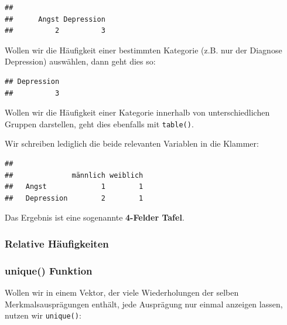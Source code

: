 \documentclass[
]{book}
\newenvironment{Shaded}{\begin{snugshade}}{\end{snugshade}}
\newcommand{\FunctionTok}[1]{\textcolor[rgb]{0.13,0.29,0.53}{\textbf{#1}}}
\newcommand{\NormalTok}[1]{#1}
\newcommand{\SpecialCharTok}[1]{\textcolor[rgb]{0.81,0.36,0.00}{\textbf{#1}}}
\newcommand{\StringTok}[1]{\textcolor[rgb]{0.31,0.60,0.02}{#1}}
\begin{document}
\begin{verbatim}
## 
##      Angst Depression 
##          2          3
\end{verbatim}

Wollen wir die Häufigkeit einer bestimmten Kategorie (z.B. nur der Diagnose Depression) auswählen, dann geht dies so:

\begin{Shaded}
\end{Shaded}

\begin{verbatim}
## Depression 
##          3
\end{verbatim}

Wollen wir die Häufigkeit einer Kategorie innerhalb von unterschiedlichen Gruppen darstellen, geht dies ebenfalls mit \texttt{table()}.

Wir schreiben lediglich die beide relevanten Variablen in die Klammer:

\begin{Shaded}
\end{Shaded}

\begin{verbatim}
##             
##              männlich weiblich
##   Angst             1        1
##   Depression        2        1
\end{verbatim}

Das Ergebnis ist eine sogenannte \textbf{4-Felder Tafel}.

\subsubsection{Relative Häufigkeiten}\label{relative-huxe4ufigkeiten}

\subsubsection{unique() Funktion}\label{unique-funktion}

Wollen wir in einem Vektor, der viele Wiederholungen der selben Merkmalsausprägungen enthält, jede Ausprägung nur einmal anzeigen lassen, nutzen wir \texttt{unique()}:
\end{document}

